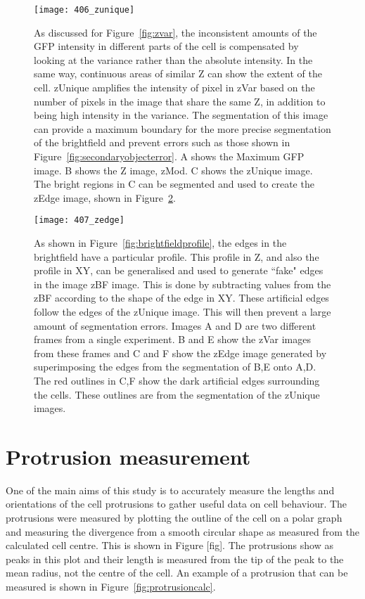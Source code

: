 \begin{figure}[h!]
 \centering
 \texttt{[image: 406\_zunique]}
 \caption[zUnique example]{
 	As discussed for Figure~\ref{fig:zvar}, the inconsistent amounts of the GFP intensity in different parts of the cell is compensated by looking at the variance rather than the absolute intensity. In the same way, continuous areas of similar Z can show the extent of the cell. zUnique amplifies the intensity of pixel in zVar based on the number of pixels in the image that share the same Z, in addition to being high intensity in the variance. The segmentation of this image can provide a maximum boundary for the more precise segmentation of the brightfield and prevent errors such as those shown in Figure~\ref{fig:secondaryobjecterror}. A shows the Maximum GFP image. B shows the Z image, zMod. C shows the zUnique image. The bright regions in C can be segmented and used to create the zEdge image, shown in Figure~\ref{fig:zedge}.
 }
 \label{fig:zunique}
\end{figure}

\begin{figure}[h!]
 \centering
 \texttt{[image: 407\_zedge]}
 \caption[zEdge example]{
 	As shown in Figure~\ref{fig:brightfieldprofile}, the edges in the brightfield have a particular profile. This profile in Z, and also the profile in XY, can be generalised and used to generate ``fake" edges in the image zBF image. This is done by subtracting values from the zBF according to the shape of the edge in XY. These artificial edges follow the edges of the zUnique image. This will then prevent a large amount of segmentation errors. Images A and D are two different frames from a single experiment. B and E show the zVar images from these frames and C and F show the zEdge image generated by superimposing the edges from the segmentation of B,E onto A,D. The red outlines in C,F show the dark artificial edges surrounding the cells. These outlines are from the segmentation of the zUnique images.
 }
 \label{fig:zedge}
\end{figure}

\section{Protrusion measurement}

One of the main aims of this study is to accurately measure the lengths and orientations of the cell protrusions to gather useful data on cell behaviour. The protrusions were measured by plotting the outline of the cell on a polar graph and measuring the divergence from a smooth circular shape as measured from the calculated cell centre. This is shown in Figure [fig]. The protrusions show as peaks in this plot and their length is measured from the tip of the peak to the mean radius, not the centre of the cell. An example of a protrusion that can be measured is shown in Figure~\ref{fig:protrusioncalc}.


